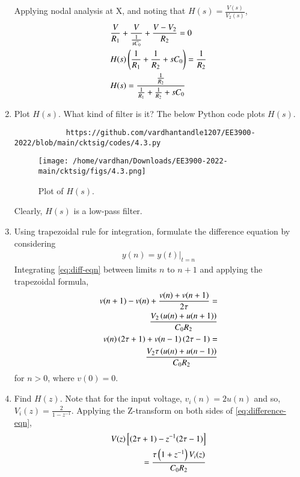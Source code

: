 \documentclass[journal,12pt,twocolumn]{IEEEtran}
\renewcommand\thesection{\arabic{section}}
\begin{document}
\begin{enumerate}[label=\arabic*.,ref=\thesection.\theenumi]
\begin{figure}[!htb]
\begin{center}
			\end{center}
			\caption{}
			\label{fig:sckt-q4}
		\end{figure}
		Applying nodal analysis at X, and noting that 
		$H(s) = \frac{V(s)}{V_2(s)}$,
		\begin{align}
			&\frac{V}{R_1} + \frac{V}{\frac{1}{sC_0}} + \frac{V - V_2}{R_2} = 0 \\
			&H(s)\left(\frac{1}{R_1} + \frac{1}{R_2} + sC_0\right) = \frac{1}{R_2} \\
			&H(s) = \frac{\frac{1}{R_2}}{\frac{1}{R_1} + \frac{1}{R_2} + sC_0}
			\label{eq:Hs}
		\end{align}
		\item Plot $H(s)$. What kind of filter is it?
		\solution The below Python code plots $H(s)$.
		\begin{lstlisting}
			https://github.com/vardhantandle1207/EE3900-2022/blob/main/cktsig/codes/4.3.py
		\end{lstlisting}
		\begin{figure}[!ht]
			\texttt{[image: /home/vardhan/Downloads/EE3900-2022-main/cktsig/figs/4.3.png]}
			\caption{Plot of $H(s)$.}
			\label{fig:Hs}
		\end{figure}
		Clearly, $H(s)$ is a low-pass filter.
		\item Using trapezoidal rule for integration, formulate the difference
		equation by considering 
		\begin{align}
			y(n) = y(t)\vert_{t=n}
		\end{align}
		\solution Integrating \eqref{eq:diff-eqn} between limits $n$ to $n+1$ 
		and applying the trapezoidal formula,
		\begin{align}
			v(n+1) - v(n) + \frac{v(n) + v(n+1)}{2\tau} = \nonumber\\
			\frac{V_2\left(u(n)+u(n+1)\right)}{C_0R_2} \\
			v(n)\left(2\tau+1\right) + v(n-1)\left(2\tau-1\right) = \nonumber\\ 
			\frac{V_2\tau\left(u(n)+u(n-1)\right)}{C_0R_2}
			\label{eq:difference-eqn}
		\end{align}
		for $n > 0$, where $v(0) = 0$.
		\item Find $H(z)$.
		\solution Note that for the input voltage, $v_i(n) = 2u(n)$ and
		so, $V_i(z) = \frac{2}{1-z^{-1}}$. Applying the Z-transform
		on both sides of \eqref{eq:difference-eqn},
		\begin{align}
			V(z)\sbrak{(2\tau + 1) - z^{-1}(2\tau - 1)} \nonumber \\
			= \frac{\tau\brak{1 + z^{-1}}V_i(z)}{C_0R_2}

\end{align}
\end{enumerate}
\end{document}
